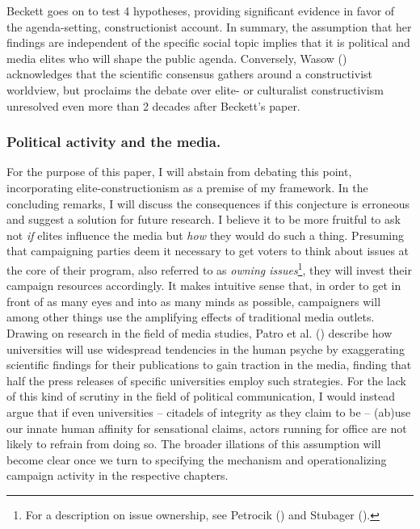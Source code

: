 \documentclass[11pt,a4paper]{article}
\begin{document}
Beckett goes on to test 4 hypotheses, providing significant evidence in favor of the agenda-setting, constructionist account. In summary, the assumption that her findings are independent of the specific social topic implies that it is political and media elites who will shape the public agenda. Conversely, Wasow (\citeyear{wasow_agenda_2020}) acknowledges that the scientific consensus gathers around a constructivist worldview, but proclaims the debate over elite- or culturalist constructivism unresolved even more than 2 decades after Beckett’s paper.

\subsubsection{Political activity and the media.}
For the purpose of this paper, I will abstain from debating this point, incorporating elite-constructionism as a premise of my framework. In the concluding remarks, I will discuss the consequences if this conjecture is erroneous and suggest a solution for future research. I believe it to be more fruitful to ask not \textit{if} elites influence the media but \textit{how} they would do such a thing. Presuming that campaigning parties deem it necessary to get voters to think about issues at the core of their program, also referred to as \textit{owning issues}\footnote{For a description on issue ownership, see Petrocik (\citeyear{petrocik_issue_1996}) and Stubager (\citeyear{stubager_what_2018}).}, they will invest their campaign resources accordingly. It makes intuitive sense that, in order to get in front of as many eyes and into as many minds as possible, campaigners will among other things use the amplifying effects of traditional media outlets. Drawing on research in the field of media studies, Patro et al. (\citeyear{patro_characterizing_2018}) describe how universities will use widespread tendencies in the human psyche by exaggerating scientific findings for their publications to gain traction in the media, finding that half the press releases of specific universities employ such strategies. For the lack of this kind of scrutiny in the field of political communication, I would instead argue that if even universities – citadels of integrity as they claim to be – (ab)use our innate human affinity for sensational claims, actors running for office are not likely to refrain from doing so. The broader illations of this assumption will become clear once we turn to specifying the mechanism and operationalizing campaign activity in the respective chapters.
\end{document}
